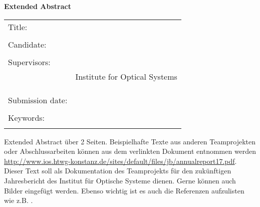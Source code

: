 \thispagestyle{plain}
\vspace*{11pt}
\begin{center}
	{\LARGE \textbf{\textsf{Extended Abstract}}}
\end{center}

\bigskip
\begin{center}
	\begin{tabular}{p{3.2cm}p{9.6cm}}
		Title: & \thema \\
		 & \\
		Candidate: & \autor \\
		 & \\
		Supervisors: & \prueferA \\[.5ex]
		 & Institute for Optical Systems\\[3ex]
		 & \prueferB \\[.5ex]
		 & \firma \\
		 & \\
		Submission date: & \abgabedatum \\
		 & \\
		Keywords: & \schlagworte \\
		 & \\
	\end{tabular}
\end{center}

\bigskip

\noindent
Extended Abstract über 2 Seiten. Beispielhafte Texte aus anderen Teamprojekten oder Abschlussarbeiten können aus dem verlinkten Dokument entnommen werden \href{http://www.ios.htwg-konstanz.de/sites/default/files/jb/annualreport17.pdf}{http://www.ios.htwg-konstanz.de/sites/default/files/jb/annualreport17.pdf}.\\

\noindent Dieser Text soll als Dokumentation des Teamprojekts für den zukünftigen Jahresbericht des Institut für Optische Systeme dienen. Gerne können auch Bilder eingefügt werden. Ebenso wichtig ist es auch die Referenzen aufzulisten wie z.B. \cite{rusu20113d}.